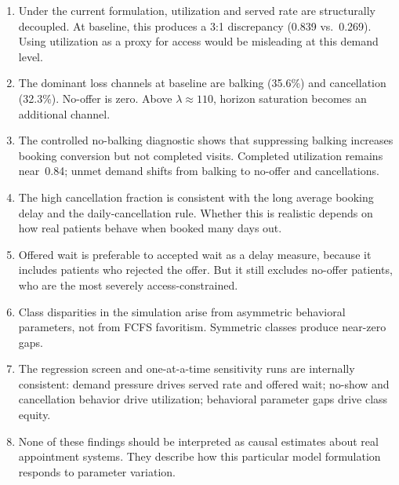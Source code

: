 \documentclass[11pt]{article}
\begin{document}
\begin{enumerate}[leftmargin=1.5em, itemsep=4pt]
\item Under the current formulation, utilization and served rate are
structurally decoupled. At baseline, this produces a 3:1 discrepancy
(0.839 vs.\ 0.269). Using utilization as a proxy for access would be
misleading at this demand level.

\item The dominant loss channels at baseline are balking (35.6\%) and
cancellation (32.3\%). No-offer is zero. Above $\lambda \approx 110$,
horizon saturation becomes an additional channel.

\item The controlled no-balking diagnostic shows that suppressing balking
increases booking conversion but not completed visits. Completed utilization
remains near~0.84; unmet demand shifts from balking to no-offer and
cancellations.

\item The high cancellation fraction is consistent with the long average
booking delay and the daily-cancellation rule. Whether this is realistic
depends on how real patients behave when booked many days out.

\item Offered wait is preferable to accepted wait as a delay measure,
because it includes patients who rejected the offer. But it still excludes
no-offer patients, who are the most severely access-constrained.

\item Class disparities in the simulation arise from asymmetric behavioral
parameters, not from FCFS favoritism. Symmetric classes produce
near-zero gaps.

\item The regression screen and one-at-a-time sensitivity runs are
internally consistent: demand pressure drives served rate and offered
wait; no-show and cancellation behavior drive utilization; behavioral
parameter gaps drive class equity.

\item None of these findings should be interpreted as causal estimates
about real appointment systems. They describe how this particular model
formulation responds to parameter variation.
\end{enumerate}
\end{document}
